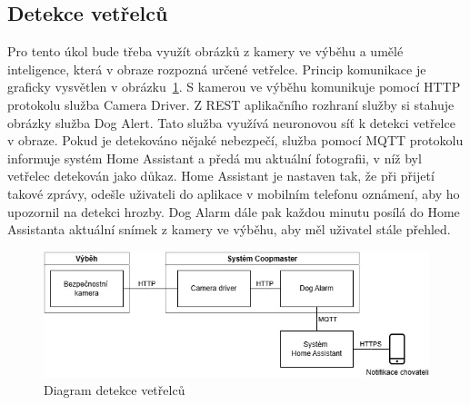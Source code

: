 \subsection{Detekce vetřelců}
Pro tento úkol bude třeba využít obrázků z kamery ve výběhu a umělé inteligence, která v obraze rozpozná určené vetřelce.
Princip komunikace je graficky vysvětlen v obrázku~\ref{fig:detekce_vetrelcu}.\newline
S kamerou ve výběhu komunikuje pomocí HTTP protokolu služba Camera Driver.
Z REST aplikačního rozhraní služby si stahuje obrázky služba Dog Alert.
Tato služba využívá neuronovou síť k detekci vetřelce v obraze.
Pokud je detekováno nějaké nebezpečí, služba pomocí MQTT protokolu informuje systém Home Assistant a předá mu aktuální fotografii, v níž byl vetřelec detekován jako důkaz.
Home Assistant je nastaven tak, že při přijetí takové zprávy, odešle uživateli do aplikace v mobilním telefonu oznámení, aby ho upozornil na detekci hrozby.
Dog Alarm dále pak každou minutu posílá do Home Assistanta aktuální snímek z kamery ve výběhu, aby měl uživatel stále přehled.
\begin{figure}[h]
    \centering
    \includegraphics[width=\textwidth]{img/detekce_vetrelcu}
    \caption{Diagram detekce vetřelců}
    \label{fig:detekce_vetrelcu}
\end{figure}

